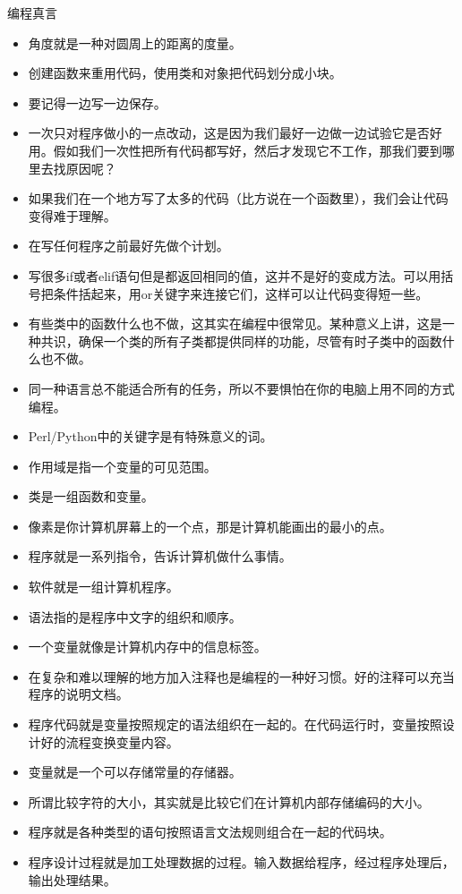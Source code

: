 \begin{frame}
\begin{block}{编程真言}
\begin{itemize}
      \item 角度就是一种对圆周上的距离的度量。
      \item 创建函数来重用代码，使用类和对象把代码划分成小块。
      \item 要记得一边写一边保存。
      \item 一次只对程序做小的一点改动，这是因为我们最好一边做一边试验它是否好用。假如我们一次性把所有代码都写好，然后才发现它不工作，那我们要到哪里去找原因呢？
      \item 如果我们在一个地方写了太多的代码（比方说在一个函数里），我们会让代码变得难于理解。
      \item 在写任何程序之前最好先做个计划。
      \item 写很多if或者elif语句但是都返回相同的值，这并不是好的变成方法。可以用括号把条件括起来，用or关键字来连接它们，这样可以让代码变得短一些。
      \item 有些类中的函数什么也不做，这其实在编程中很常见。某种意义上讲，这是一种共识，确保一个类的所有子类都提供同样的功能，尽管有时子类中的函数什么也不做。
      \item 同一种语言总不能适合所有的任务，所以不要惧怕在你的电脑上用不同的方式编程。
      \item Perl/Python中的关键字是有特殊意义的词。
      \item 作用域是指一个变量的可见范围。
      \item 类是一组函数和变量。
      \item 像素是你计算机屏幕上的一个点，那是计算机能画出的最小的点。
      \item 程序就是一系列指令，告诉计算机做什么事情。
      \item 软件就是一组计算机程序。
      \item 语法指的是程序中文字的组织和顺序。
      \item 一个变量就像是计算机内存中的信息标签。
      \item 在复杂和难以理解的地方加入注释也是编程的一种好习惯。好的注释可以充当程序的说明文档。
      \item 程序代码就是变量按照规定的语法组织在一起的。在代码运行时，变量按照设计好的流程变换变量内容。
      \item 变量就是一个可以存储常量的存储器。
      \item 所谓比较字符的大小，其实就是比较它们在计算机内部存储编码的大小。
      \item 程序就是各种类型的语句按照语言文法规则组合在一起的代码块。
      \item 程序设计过程就是加工处理数据的过程。输入数据给程序，经过程序处理后，输出处理结果。

\end{itemize}
\end{block}
\end{frame}
